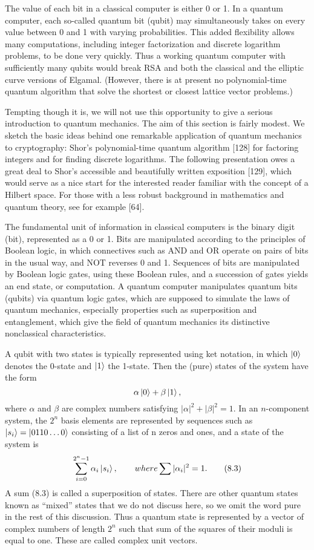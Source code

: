 \documentclass{article}
\begin{document}
The value of each bit in a classical computer is either 0 or 1. In a quantum computer, each so-called quantum bit (qubit) may simultaneously takes on every value between 0 and 1 with varying probabilities. This added flexibility  allows many computations, including integer factorization and discrete logarithm problems, to be done very quickly. Thus a working quantum computer with sufficiently many qubits would break RSA and both the classical and the elliptic curve versions of Elgamal. (However, there is at present no polynomial-time quantum algorithm that solve the shortest or closest lattice vector problems.)

Tempting though it is, we will not use this opportunity to give a serious introduction to quantum mechanics. The aim of this section is fairly modest. We sketch the basic ideas behind one remarkable application of quantum mechanics to cryptography: Shor's polynomial-time quantum algorithm [128] for factoring integers and for finding discrete logarithms. The following presentation owes a great deal to Shor's accessible and beautifully written exposition [129], which would serve as a nice start for the interested reader familiar with the concept of a Hilbert space. For those with a less robust background in mathematics and quantum theory, see for example [64].

The fundamental unit of information in classical computers is the binary digit (bit), represented as a 0 or 1. Bits are manipulated according to the principles of Boolean logic, in which connectives such as AND and OR operate on pairs of bits in the usual way, and NOT reverses 0 and 1. Sequences of bits are manipulated by Boolean logic gates, using these Boolean rules, and a succession of gates yields an end state, or computation. A quantum computer manipulates quantum bits (qubits) via quantum logic gates, which are supposed to simulate the laws of quantum mechanics, especially properties such as superposition and entanglement, which give the field of quantum mechanics its distinctive nonclassical characteristics.

A qubit with two states is typically represented using ket notation, in which \(\ket{0}\) denotes the 0-state and \(\ket{1}\) the 1-state. Then the (pure) states of the system have the form
\[
    \alpha \ket{0} + \beta \ket{1},
\]
where \(\alpha\) and \(\beta\) are complex numbers satisfying \(|\alpha|^2 + |\beta|^2 = 1\). In an \(n\)-component system, the \(2^{n}\) basis elements are represented by sequences such as \(\ket{s_i} = \ket{0110 \dots 0}\) consisting of a list of n zeros and ones, and a state of the system is 
\[
	\sum_{i = 0}^{2^n - 1} \alpha_i \ket{s_i}, \qquad where \sum |\alpha_i|^2 = 1. \tag{8.3}
\]
A sum (8.3) is called a superposition of states. There are other quantum states known as “mixed” states that we do not discuss here, so we omit the word pure in the rest of this discussion. Thus a quantum state is represented by a vector of complex numbers of length \(2^n\) such that sum of the squares of their moduli is equal to one. These are called complex unit vectors.
\end{document}
